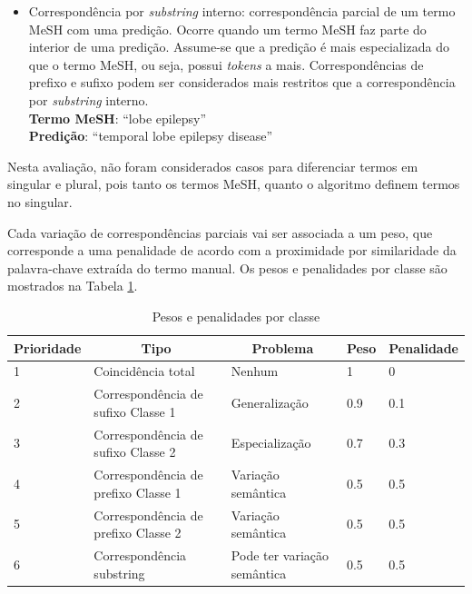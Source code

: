 \begin{itemize}
    \item Correspondência por \emph{substring} interno: correspondência parcial de um termo MeSH com uma predição. Ocorre quando um termo MeSH faz parte do interior de uma predição. Assume-se que a predição é mais especializada do que o termo MeSH, ou seja, possui \emph{tokens} a mais. Correspondências de prefixo e sufixo podem ser considerados mais restritos  que a correspondência por \emph{substring} interno. \\
\textbf{Termo MeSH}: “lobe epilepsy”\\
\textbf{Predição}: “temporal lobe epilepsy disease”
\end{itemize}

Nesta avaliação, não foram considerados casos para diferenciar termos em singular e plural, pois tanto os termos MeSH, quanto o algoritmo definem termos no singular.

Cada variação de correspondências parciais vai ser associada a um peso, que corresponde a uma penalidade de acordo com a proximidade por similaridade da palavra-chave extraída do termo manual. Os pesos e penalidades por classe são mostrados na Tabela \ref{tab:pesosSimilaridade}.

\begin{table}[htbp]
\begin{center}
\begin{tabular}{|l|p{3cm}|l|l|l|}
\hline
\multicolumn{1}{|c|}{\textbf{Prioridade}} & \multicolumn{1}{c|}{\textbf{Tipo}} & \multicolumn{1}{c|}{\textbf{Problema}} & \multicolumn{1}{c|}{\textbf{Peso}} & \multicolumn{1}{c|}{\textbf{Penalidade}} \\ \hline
1 & Coincidência \mbox{total} & Nenhum & 1 & 0 \\ \hline
2 & Correspondência de sufixo Classe 1 & Generalização  & 0.9 & 0.1 \\ \hline
3 & Correspondência de sufixo Classe 2 & Especialização  & 0.7 & 0.3 \\ \hline
4 & Correspondência de prefixo Classe 1 & Variação semântica  & 0.5 & 0.5 \\ \hline
5 & Correspondência de prefixo Classe 2 & Variação semântica  & 0.5 & 0.5 \\ \hline
6 & Correspondência substring  & Pode ter variação semântica  & 0.5 & 0.5 \\ \hline
\end{tabular}
\end{center}
\caption{Pesos e penalidades por classe}
\label{tab:pesosSimilaridade}
\end{table}

